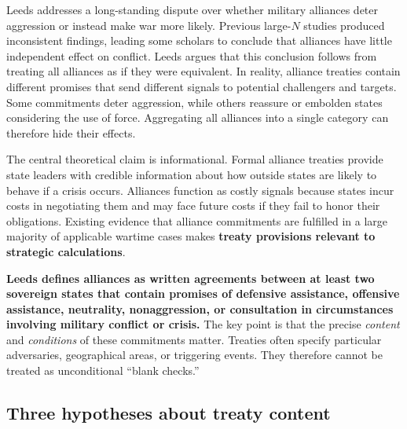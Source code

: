 Leeds addresses a long-standing dispute over whether military alliances deter aggression or instead make war more likely. Previous large-$N$ studies produced inconsistent findings, leading some scholars to conclude that alliances have little independent effect on conflict. Leeds argues that this conclusion follows from treating all alliances as if they were equivalent. In reality, alliance treaties contain different promises that send different signals to potential challengers and targets. Some commitments deter aggression, while others reassure or embolden states considering the use of force. Aggregating all alliances into a single category can therefore hide their effects.

The central theoretical claim is informational. Formal alliance treaties provide state leaders with credible information about how outside states are likely to behave if a crisis occurs. Alliances function as costly signals because states incur costs in negotiating them and may face future costs if they fail to honor their obligations. Existing evidence that alliance commitments are fulfilled in a large majority of applicable wartime cases makes \textbf{treaty provisions relevant to strategic calculations}.

\textbf{Leeds defines alliances as written agreements between at least two sovereign states that contain promises of defensive assistance, offensive assistance, neutrality, nonaggression, or consultation in circumstances involving military conflict or crisis.} The key point is that the precise \emph{content} and \emph{conditions} of these commitments matter. Treaties often specify particular adversaries, geographical areas, or triggering events. They therefore cannot be treated as unconditional ``blank checks.''

\subsection{Three hypotheses about treaty content}


